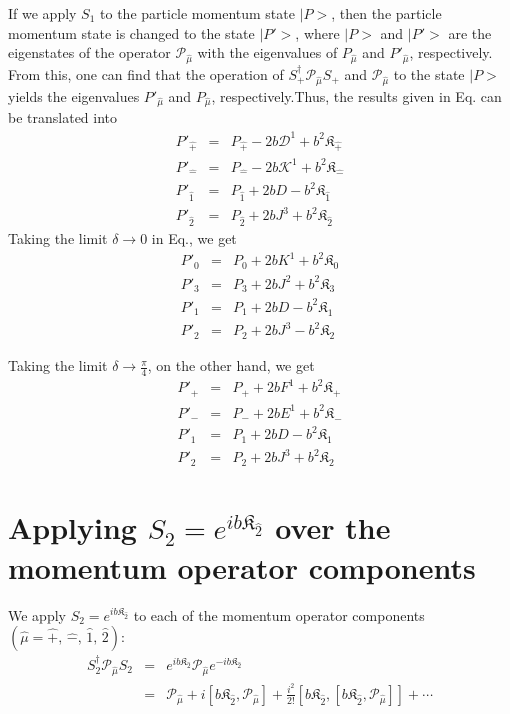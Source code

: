 \documentclass[]{article}
\numberwithin{equation}{section}
\def\bea{\begin{eqnarray}}
\def\eea{\end{eqnarray}}
\def\wh{\widehat}
\begin{document}
{{If we apply $S_1$ to the particle momentum state $|P>$, then the particle momentum state is changed to
the state $|P'>$, where $|P>$ and $|P'>$ are the eigenstates of the operator 
${\mathcal P}_{\wh{\mu}}$ with the eigenvalues of  $P_{\wh{\mu}}$ 
and $P'_{\wh{\mu}}$, respectively. From this, one can find that the operation of 
$S_+^{\dagger} {\mathcal P}_{\wh{\mu}}S_+$ and ${\mathcal P}_{\wh{\mu}}$ to the state $|P>$ yields the eigenvalues 
$P'_{\wh{\mu}}$ and $P_{\wh{\mu}}$, respectively.Thus, the results given in Eq. can be translated into
\bea
P'_{\wh+} & = & P_{\wh+}-2b\mathcal{D}^1+{b^2}\mathfrak{K}_{\hat{+}}
\nonumber\\ 
P'_{\wh-} & = & P_{\wh-}-2b\mathcal{K}^1+{b^2}\mathfrak{K}_{\hat{-}}
\nonumber\\
P'_{\wh{1}} & = & {P}_{\wh{1}}+2bD-b^2\mathfrak{K}_{\hat{1}} \nonumber\\
P'_{\wh{2}} & = & {P}_{\wh{2}}+2bJ^3+b^2\mathfrak{K}_{\hat{2}}
\eea
%
Taking the limit $\delta \rightarrow 0$ in Eq., we get
\bea
P'_{0} & = & P_{0}+2bK^1+{b^2}\mathfrak{K}_{0}
\nonumber\\ 
P'_{3} & = & P_{3}+2bJ^2+{b^2}\mathfrak{K}_{3}
\nonumber\\
P'_{{1}} & = & {P}_{{1}}+2bD-b^2\mathfrak{K}_{{1}} \nonumber\\
P'_{{2}} & = & {P}_{{2}}+2bJ^3-b^2\mathfrak{K}_{{2}}
\eea

Taking the limit $\delta \rightarrow \frac{\pi}{4}$, on the other hand, we get
\bea
P'_{+} & = & P_{+}+2bF^1+{b^2}\mathfrak{K}_{{+}}
\nonumber\\ 
P'_{-} & = & P_{-}+2bE^1+{b^2}\mathfrak{K}_{{-}}
\nonumber\\
P'_{{1}} & = & {P}_{{1}}+2bD-b^2\mathfrak{K}_{{1}} \nonumber\\
P'_{{2}} & = & {P}_{{2}}+2bJ^3+b^2\mathfrak{K}_{{2}}
\eea



\section{Applying $S_2 =e^{ib\mathfrak{K}_{\hat{2}}}$ over the momentum operator components}

We apply $S_2 =e^{ib\mathfrak{K}_{\hat{2}}}$ to each of the momentum operator components $(\wh{\mu} = \wh+,\,\wh- ,\, \wh1,\, \wh2)$:
\bea
S_2^{\dagger} {\mathcal P}_{\wh{\mu}}S_2 & = & e^{ib\mathfrak{K}_{\hat{2}}} {\mathcal P}_{\wh{\mu}} e^{-ib\mathfrak{K}_{\hat{2}}} \nonumber \\
                                 & = & {\mathcal P}_{\wh{\mu}} + i\left[b\mathfrak{K}_{\hat{2}}, {\mathcal P}_{\wh{\mu}} \right] + \frac{i^2}{2!}\left[b\mathfrak{K}_{\hat{2}}, \left[b\mathfrak{K}_{\hat{2}}, {\mathcal P}_{\wh{\mu}} \right]\right] + \cdots
\eea
% 

}}
\end{document}
